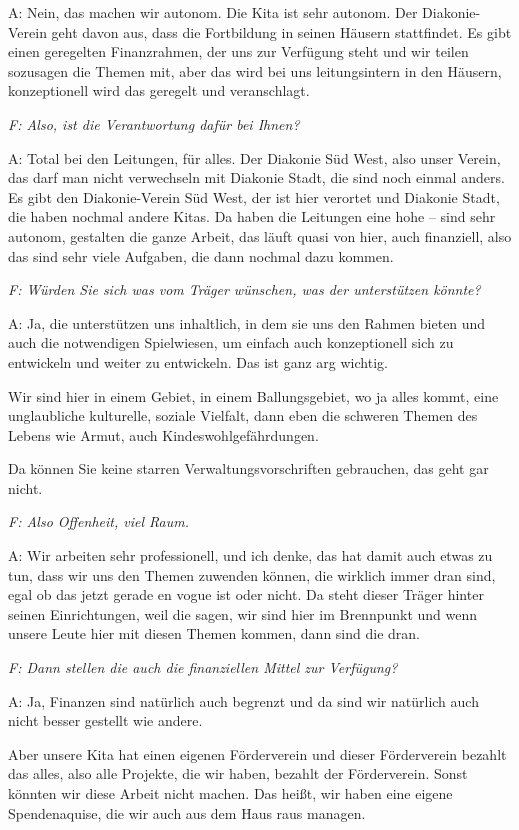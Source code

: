 \begin{linenumbers*}
A: Nein, das machen wir autonom. Die Kita ist sehr autonom. Der Diakonie-Verein geht davon aus, dass die Fortbildung in seinen Häusern stattfindet. Es gibt einen geregelten Finanzrahmen, der uns zur Verfügung steht und wir teilen sozusagen die Themen mit, aber das wird bei uns leitungsintern in den Häusern, konzeptionell wird das geregelt und veranschlagt.
 
\emph{F: Also, ist die Verantwortung dafür bei Ihnen?}

A: Total bei den Leitungen, für alles. Der Diakonie Süd West, also unser Verein, das darf man nicht verwechseln mit Diakonie Stadt, die sind noch einmal anders. Es gibt den Diakonie-Verein Süd West, der ist hier verortet und Diakonie Stadt, die haben nochmal andere Kitas. Da haben die Leitungen eine hohe -- sind sehr autonom, gestalten die ganze Arbeit, das läuft quasi von hier, auch finanziell, also das sind sehr viele Aufgaben, die dann nochmal dazu kommen. 

\emph{F: Würden Sie sich was vom Träger wünschen, was der unterstützen könnte?}

A: Ja, die unterstützen uns inhaltlich, in dem sie uns den Rahmen bieten und auch die notwendigen Spielwiesen, um einfach auch konzeptionell sich zu entwickeln und weiter zu entwickeln. Das ist ganz arg wichtig. 

Wir sind hier in einem Gebiet, in einem Ballungsgebiet, wo ja alles kommt, eine unglaubliche kulturelle, soziale Vielfalt, dann eben die schweren Themen des Lebens wie Armut, auch Kindeswohlgefährdungen. 

Da können Sie keine starren Verwaltungsvorschriften gebrauchen, das geht gar nicht. 

\emph{F: Also Offenheit, viel Raum.}

A: Wir arbeiten sehr professionell, und ich denke, das hat damit auch etwas zu tun, dass wir uns den Themen zuwenden können, die wirklich immer dran sind, egal ob das jetzt gerade en vogue ist oder nicht. Da steht dieser Träger hinter seinen Einrichtungen, weil die sagen, wir sind hier im Brennpunkt und wenn unsere Leute hier mit diesen Themen kommen, dann sind die dran. 

\emph{F: Dann stellen die auch die finanziellen Mittel zur Verfügung?}

A: Ja, Finanzen sind natürlich auch begrenzt und da sind wir natürlich auch nicht besser gestellt wie andere. 

Aber unsere Kita hat einen eigenen Förderverein und dieser Förderverein bezahlt das alles, also alle Projekte, die wir haben, bezahlt der Förderverein. Sonst könnten wir diese Arbeit nicht machen. Das heißt, wir haben eine eigene Spendenaquise, die wir auch aus dem Haus raus managen. 


\end{linenumbers*}
